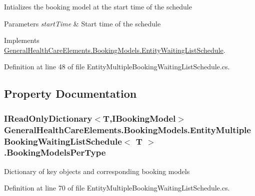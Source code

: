 Intializes the booking model at the start time of the schedule 


\begin{DoxyParams}{Parameters}
{\em start\+Time} & Start time of the schedule\\
\hline
\end{DoxyParams}


Implements \hyperlink{class_general_health_care_elements_1_1_booking_models_1_1_entity_waiting_list_schedule_a252eb13c100e62bfe44db2bf250be437}{General\+Health\+Care\+Elements.\+Booking\+Models.\+Entity\+Waiting\+List\+Schedule}.



Definition at line 48 of file Entity\+Multiple\+Booking\+Waiting\+List\+Schedule.\+cs.



\subsection{Property Documentation}
\subsubsection[{\texorpdfstring{Booking\+Models\+Per\+Type}{BookingModelsPerType}}]{\setlength{\rightskip}{0pt plus 5cm}I\+Read\+Only\+Dictionary$<$T,{\bf I\+Booking\+Model}$>$ {\bf General\+Health\+Care\+Elements.\+Booking\+Models.\+Entity\+Multiple\+Booking\+Waiting\+List\+Schedule}$<$ T $>$.Booking\+Models\+Per\+Type\hspace{0.3cm}{\ttfamily [get]}}\hypertarget{class_general_health_care_elements_1_1_booking_models_1_1_entity_multiple_booking_waiting_list_schedule_a0e182854f565fe9e833710e445b2540a}{}\label{class_general_health_care_elements_1_1_booking_models_1_1_entity_multiple_booking_waiting_list_schedule_a0e182854f565fe9e833710e445b2540a}


Dictionary of key objects and corresponding booking models 



Definition at line 70 of file Entity\+Multiple\+Booking\+Waiting\+List\+Schedule.\+cs.

